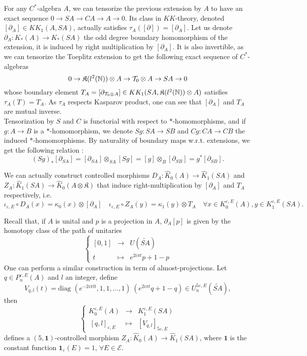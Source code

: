 For any $C^*$-algebra $A$, we can tensorize the previous extension by $A$ to have an exact sequence $0\rightarrow SA \rightarrow CA \rightarrow A \rightarrow  0 $. Its class in $KK$-theory, denoted $[\partial_{A}]\in KK_1(A,SA)$, actually satisfies $\tau_A([\partial ]) =[\partial_{A}]$. Let us denote $\partial_A : K_*(A)\rightarrow K_*(SA)$ the odd degree boundary homomorphism of the extension, it is induced by right multiplication by $[\partial_A]$. It is also invertible, as we can tensorize the Toeplitz extension to get the following exact sequence of $C^*$-algebras
\[0\rightarrow \mathfrak K(l^2(\mathbb N))\otimes A \rightarrow \mathcal T_0 \otimes A \rightarrow SA \rightarrow 0 \]
whose boundary element $T_A =[\partial_{\mathcal T_0 \otimes A }]\in KK_1(SA,\mathfrak K(l^2(\mathbb N))\otimes A)$ satisfies $\tau_A(T)= T_A$. As $\tau_A$ respects Kasparov product, one can see that $[\partial_A]$ and $T_A$ are mutual inverse.\\

Tensorization by $S$ and $C$ is functorial with respect to $*$-homomorphisms, and if $g : A\rightarrow B$ is a $*$-homomorphism, we denote $Sg : SA\rightarrow SB$ and $Cg : CA\rightarrow CB$ the induced $*$-homomorphisms. By naturality of boundary maps w.r.t. extensions, we get the following relation :
\[(Sg)_*[\partial_{SA}] = [\partial_{SA}]\otimes_{SA} [Sg] = [g]\otimes_{B} [\partial_{SB}] = g^*[\partial_{SB}] .\]

We can actually construct controlled morphisms $D_{A} :\hat K_0(A)\rightarrow \hat K_{1}(SA)$ and $Z_A :\hat K_1(SA)\rightarrow \hat K_{0}(A\otimes \mathfrak K)$ that induce right-multiplication by $[\partial_A]$ and $T_A$ respectively, i.e.
\[\iota_{\varepsilon,E}\circ D_A(x) = \kappa_0(x) \otimes [\partial_A]\quad \iota_{\varepsilon,E}\circ Z_A(y) = \kappa_1(y) \otimes T_A \quad \forall x\in K_0^{\varepsilon, E}(A),y\in K_1^{\varepsilon, E}(SA). \]

Recall that, if $A$ is unital and $p$ is a projection in $A$, $\partial_A [p]$ is given by the homotopy class of the path of unitaries 
\[\left\{\begin{array}{rcl} [0,1] & \rightarrow & U(\tilde{SA}) \\ t & \mapsto & e^{2i\pi t}p + 1-p\end{array}\right.\]
One can perform a similar construction in term of almost-projections. Let $q\in P_n^{\varepsilon,E}(A)$ and $l$ an integer, define 
\[V_{q,l}(t) = \text{diag }(e^{-2i\pi l t}, 1, 1,...,1) \ (e^{2i\pi t}q +1-q)\in U^{5\varepsilon,E}_n(\tilde{SA}),\]
then 
\[\left\{\begin{array}{rcl} 
K_0^{\varepsilon,E}(A) & \rightarrow & K_1^{\varepsilon,E}(SA) \\ 
\ [q,l]_{\varepsilon,E} & \mapsto & [V_{q,l}]_{5\varepsilon,E}
\end{array}\right.\]
defines a $(5,\textbf{1})$-controlled morphism $Z_A : \hat K_0(A)\rightarrow \hat K_1(SA)$, where $\textbf{1}$ is the constant function $\textbf{1}_\varepsilon(E) = 1$, $\forall E\in\mathcal E$.

